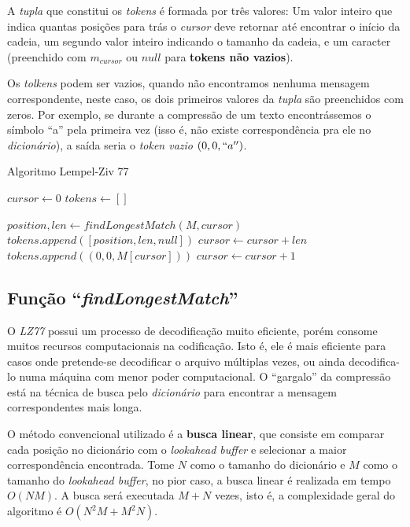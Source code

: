 A \emph{tupla} que constitui os \emph{tokens} é formada por três valores:
Um valor inteiro que indica quantas posições para trás o \emph{cursor} deve retornar até encontrar o início da cadeia, 
um segundo valor inteiro indicando o tamanho da cadeia,
e um caracter (preenchido com $m_{cursor}$ ou $null$ para \textbf{tokens não vazios}).

Os \emph{tolkens} podem ser vazios, quando não encontramos nenhuma mensagem correspondente, neste caso, os dois primeiros valores da \emph{tupla} são preenchidos com zeros.
Por exemplo, se durante a compressão de um texto encontrássemos o símbolo ``a'' pela primeira vez (isso é, não existe correspondência pra ele no \emph{dicionário}), a saída seria o \emph{token vazio} $(0, 0, ``a'')$.

\begin{algorithm}[H]
\caption{Algoritmo Lempel-Ziv 77} \label{alg:lz77}
\begin{algorithmic}

	\State $cursor \gets 0$
	\State $tokens \gets []$

		\State $position, len \gets findLongestMatch(M, cursor)$ 
		 
			\State $tokens.append([position, len, null])$
			\State $cursor \gets cursor + len$
		\Else
			\State $tokens.append((0, 0, M[cursor]))$ 
			\State $cursor \gets cursor + 1$
		\EndIf
	\EndWhile
\end{algorithmic}
\end{algorithm}

\subsection{Função ``\emph{findLongestMatch}'' }
O \emph{LZ77} possui um processo de decodificação muito eficiente, porém consome muitos recursos computacionais na codificação. 
Isto é, ele é mais eficiente para casos onde pretende-se decodificar o arquivo múltiplas vezes, ou ainda decodifica-lo numa máquina com menor poder computacional. 
O ``gargalo'' da compressão está na técnica de busca pelo \emph{dicionário} para encontrar a mensagem correspondentes mais longa.

O método convencional utilizado é a \textbf{busca linear}, que consiste em comparar cada posição no dicionário com o \emph{lookahead buffer} e selecionar a maior correspondência encontrada. 
Tome $N$ como o tamanho do dicionário e $M$ como o tamanho do \emph{lookahead buffer}, no pior caso, a busca linear é realizada em tempo $O(NM)$. 
A busca será executada $M + N$ vezes, isto é, a complexidade geral do algoritmo é $O( N^{2}M + M^{2}N)$.

